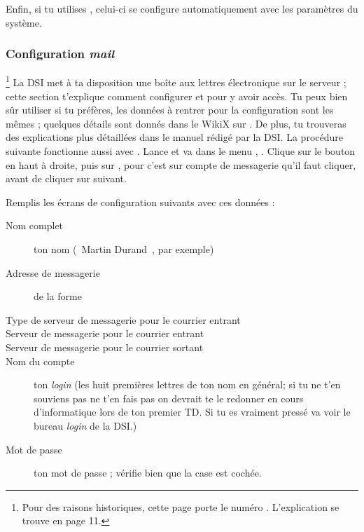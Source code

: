 Enfin, si tu utilises , celui-ci se configure automatiquement avec les param\`etres du syst\`eme.
%



\subsubsection{Configuration \emph{mail}}

 \footnote{Pour des raisons historiques, cette page porte le num\'ero \thecptr. L'explication se trouve en page 11.}
 La DSI met \`a  ta disposition une bo\^{i}te aux lettres \'electronique sur
le serveur  ; cette section t'explique comment
configurer  et  pour y avoir acc\`es. Tu peux bien
s\^{u}r utiliser  si tu pr\'ef\`eres, les donn\'ees \`a  rentrer
pour la configuration sont les m\^emes ; quelques d\'etails sont donn\'es
dans le WikiX sur \fkz. De plus, tu trouveras des explications plus
d\'etaill\'ees dans le manuel r\'edig\'e par la DSI.
La proc\'edure suivante fonctionne aussi avec .
Lance  et va dans le menu ,
. Clique sur le bouton  en
haut \`a  droite, puis sur , pour  c'est sur compte de messagerie qu'il faut cliquer, avant de cliquer sur suivant.



Remplis les \'ecrans de configuration suivants avec ces donn\'ees :
\begin{description}
  \item[Nom complet] ton nom (\guillemotleft~Martin Durand~\guillemotright , par exemple)
  \item[Adresse de messagerie] de la forme 
  \item[Type de serveur de messagerie pour le courrier entrant] 
  \item[Serveur de messagerie pour le courrier entrant] 
  \item[Serveur de messagerie pour le courrier sortant] 
  \item[Nom du compte] ton \emph{login}  (les huit premi\`eres lettres de ton nom en g\'en\'eral; si tu ne t'en souviens pas ne t'en fais pas on devrait te le redonner en cours d'informatique lors de ton premier TD. Si tu es vraiment press\'e va voir le bureau \emph{login} de la DSI.)
  \item[Mot de passe] ton mot de passe  ;
       v\'erifie bien que la case  est coch\'ee.
\end{description}

